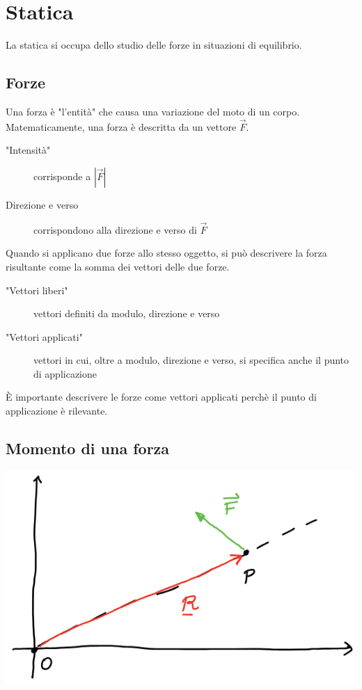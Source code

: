 \documentclass{article}
\begin{document}
\section{Statica}

La statica si occupa dello studio delle forze in situazioni di equilibrio.

\subsection{Forze}

Una forza è "l'entità" che causa una variazione del moto di un corpo.
Matematicamente, una forza è descritta da un vettore $\vec{F}$.

\begin{description}
    \item["Intensità"] corrisponde a $|\vec{F}|$
    \item[Direzione e verso] corrispondono alla direzione e verso di $\vec{F}$
\end{description}

\noindent
Quando si applicano due forze allo stesso oggetto, si può descrivere la forza risultante come la somma dei vettori delle due forze.

\begin{description}
    \item["Vettori liberi"] vettori definiti da modulo, direzione e verso
    \item["Vettori applicati"] vettori in cui, oltre a modulo, direzione e verso, si specifica anche il punto di applicazione
\end{description}

\noindent
È importante descrivere le forze come vettori applicati perchè il punto di applicazione è rilevante.

\subsection{Momento di una forza}

\includegraphics[width=\columnwidth]{esempio-momento-della-forza}
\end{document}
